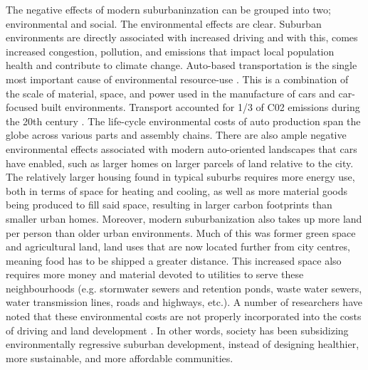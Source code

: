 The negative effects of modern suburbaninzation can be grouped into two; environmental and social. The environmental effects are clear. Suburban environments are directly associated with increased driving \cite{ewing_travel_2010,moos_suburban_2015} and with this, comes increased congestion, pollution, and emissions that impact local population health and contribute to climate change. Auto-based transportation is the single most important cause of environmental resource-use \cite{urry_systemautomobility_2004}. This is a combination of the scale of material, space, and power used in the manufacture of cars and car-focused built environments. Transport accounted for 1/3 of C02 emissions during the 20th century \cite{urry_systemautomobility_2004}. The life-cycle environmental costs of auto production span the globe across various parts and assembly chains. There are also ample negative environmental effects associated with modern auto-oriented landscapes that cars have enabled, such as larger homes on larger parcels of land relative to the city. The relatively larger housing found in typical suburbs requires more energy use, both in terms of space for heating and cooling, as well as more material goods being produced to fill said space, resulting in larger carbon footprints than smaller urban homes. Moreover, modern suburbanization also takes up more land per person than older urban environments. Much of this was former green space and agricultural land, land uses that are now located further from city centres, meaning food has to be shipped a greater distance. This increased space also requires more money and material devoted to utilities to serve these neighbourhoods (e.g. stormwater sewers and retention ponds, waste water sewers, water transmission lines, roads and highways, etc.). A number of researchers have noted that these environmental costs are not properly incorporated into the costs of driving and land development \cite{blais_perverse_2011,ewing_compactness_2015,kunstler_geography_1994}. In other words, society has been subsidizing environmentally regressive suburban development, instead of designing healthier, more sustainable, and more affordable communities.

